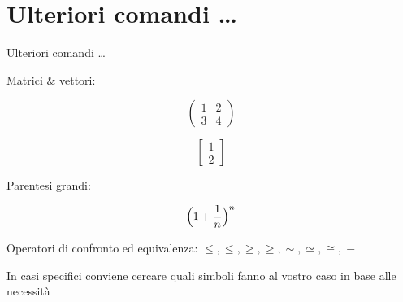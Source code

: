 \section{Ulteriori comandi \dots}
\begin{frame}{Ulteriori comandi \dots}

	Matrici \& vettori:

	\[
	\begin{pmatrix}
	1 & 2 \\
	3 & 4
	\end{pmatrix}
	\]

	\[
	\begin{bmatrix}
	1 \\
	2
	\end{bmatrix}
	\]

	Parentesi grandi:

	\[
	\Bigl(1+\frac{1}{n}\Bigr)^n
	\]

	Operatori di confronto ed equivalenza: $\le, \leq, \ge, \geq, \sim, \simeq, \cong, \equiv$

    In casi specifici conviene cercare quali simboli fanno al vostro caso in base alle necessità

\end{frame}
